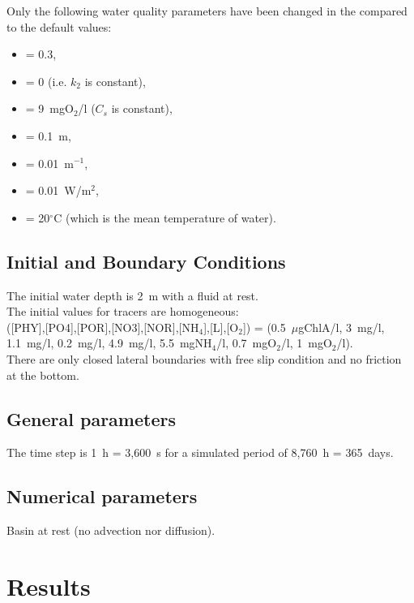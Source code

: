 Only the following water quality parameters have been changed
in the \waqtel {} compared to the default values:
\begin{itemize}
\item {} = 0.3,
\item {} = 0 (i.e. $k_2$ is constant),
\item {} = 9~mgO$_2$/l ($C_s$ is constant),
\item {} = 0.1~m,
\item {} = 0.01~m$^{-1}$,
\item {} = 0.01~W/m$^2$,
\item {} = 20$^\circ$C (which is the mean temperature of water).
\end{itemize}

\subsection{Initial and Boundary Conditions}

The initial water depth is 2~m with a fluid at rest.\\
%
The initial values for tracers are homogeneous:\\
([PHY],[PO4],[POR],[NO3],[NOR],[NH$_4$],[L],[O$_2$]) =
(0.5~$\mu$gChlA/l, 3~mg/l, 1.1~mg/l, 0.2~mg/l, 4.9~mg/l, 5.5~mgNH$_4$/l, 0.7~mgO$_2$/l, 1~mgO$_2$/l).\\
%
There are only closed lateral boundaries with free slip condition and no
friction at the bottom.

\subsection{General parameters}

The time step is 1~h = 3,600~s for a simulated period of 8,760~h = 365~days.

\subsection{Numerical parameters}

Basin at rest (no advection nor diffusion).

\section{Results}

